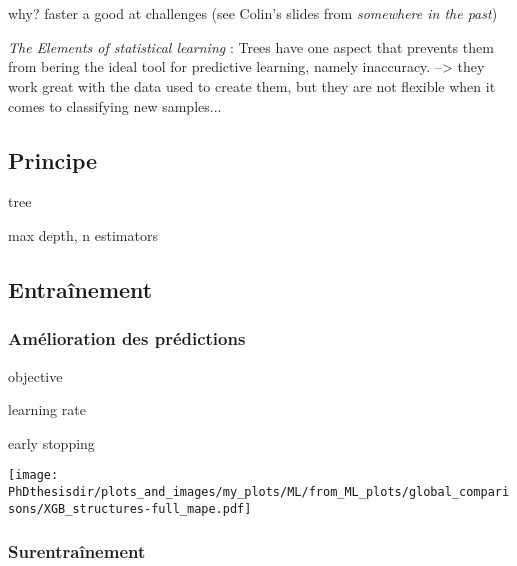 \section{\XGBOOST}\label{chapter-ML-section-XGB}
why? faster a good at challenges (see Colin's slides from \emph{somewhere in the past})

\emph{The Elements of statistical learning} : Trees have one aspect that prevents them from bering the ideal tool for predictive learning, namely inaccuracy.
--> they work great with the data used to create them, but they are not flexible when it comes to classifying new samples...
\subsection{Principe}
tree

max depth, n estimators

\subsection{Entraînement}
\subsubsection{Amélioration des prédictions}

objective

learning rate

early stopping

\texttt{[image: \\PhDthesisdir/plots\_and\_images/my\_plots/ML/from\_ML\_plots/global\_comparisons/XGB\_structures-full\_mape.pdf]}



\subsubsection{Surentraînement}




